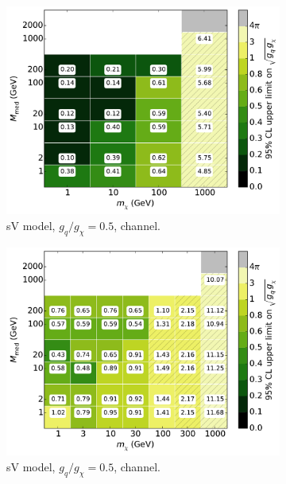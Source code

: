 \begin{figure}
  \centering
  \begin{subfigure}[t]{0.32\textwidth}
    \centering
    \includegraphics[width=1.\textwidth]{figures/grid_basepoints_SVD_rat1_monojet.pdf}
    \caption{sV model, $g_q/g_{\chi} = 0.5$, \monojet channel.}
  \end{subfigure}
  \begin{subfigure}[t]{0.32\textwidth}
    \centering
    \includegraphics[width=1.\textwidth]{figures/grid_allpoints_SVD_rat1.pdf}
    \caption{sV model, $g_q/g_{\chi} = 0.5$, \monoZ channel.}
  \end{subfigure}
  \begin{subfigure}[t]{0.32\textwidth}

\end{subfigure}
\end{figure}
